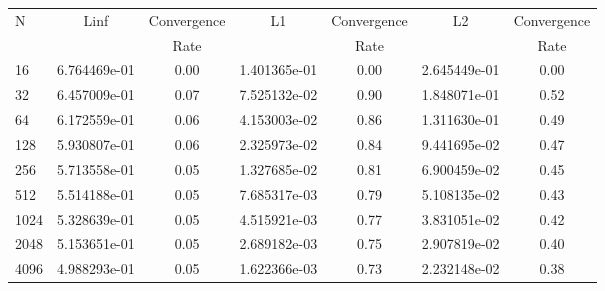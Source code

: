 \documentclass[12pt]{article}
\begin{document}
	\begin{tabular}{l|c|c|c|c|c|c}
		N&Linf&Convergence&L1&Convergence&L2&Convergence\\
		&&Rate&&Rate&&Rate\\
		\hline
		16&6.764469e-01&0.00&1.401365e-01&0.00&2.645449e-01&0.00\\
		\hline
		32&6.457009e-01&0.07&7.525132e-02&0.90&1.848071e-01&0.52\\
		\hline
		64&6.172559e-01&0.06&4.153003e-02&0.86&1.311630e-01&0.49\\
		\hline
		128&5.930807e-01&0.06&2.325973e-02&0.84&9.441695e-02&0.47\\
		\hline
		256&5.713558e-01&0.05&1.327685e-02&0.81&6.900459e-02&0.45\\
		\hline
		512&5.514188e-01&0.05&7.685317e-03&0.79&5.108135e-02&0.43\\
		\hline
		1024&5.328639e-01&0.05&4.515921e-03&0.77&3.831051e-02&0.42\\
		\hline
		2048&5.153651e-01&0.05&2.689182e-03&0.75&2.907819e-02&0.40\\
		\hline
		4096&4.988293e-01&0.05&1.622366e-03&0.73&2.232148e-02&0.38\\
	\end{tabular}
\end{document}
